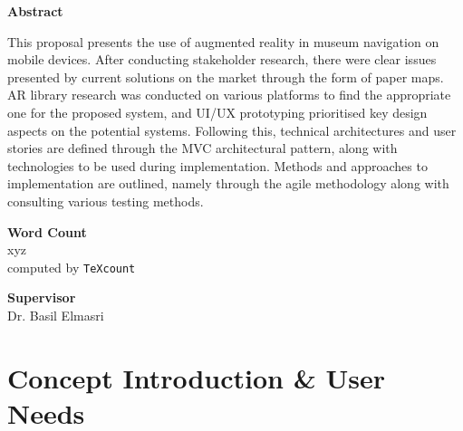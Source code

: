 \documentclass[12pt]{report}
\newcommand\blankpage{%
    \null
    \thispagestyle{empty}%
    \addtocounter{page}{-1}%
    \newpage}
\begin{document}
\begin{center}        
    \large
    \textbf{Abstract}\\
\end{center}

This proposal presents the use of augmented reality in museum navigation on mobile devices. After conducting stakeholder research, there were clear issues presented by current solutions on the market through the form of paper maps. AR library research was conducted on various platforms to find the appropriate one for the proposed system, and UI/UX prototyping prioritised key design aspects on the potential systems. Following this, technical architectures and user stories are defined through the MVC architectural pattern, along with technologies to be used during implementation. Methods and approaches to implementation are outlined, namely through the agile methodology along with consulting various testing methods.

\vspace*{1.5cm}
\begin{center}    
    \large
    \textbf{Word Count}\\
    xyz\\
    \normalsize computed by \texttt{TeXcount}
\end{center}

\vspace*{1.5cm}
\begin{center}    
    \large
    \textbf{Supervisor}\\
    \normalsize Dr. Basil Elmasri
\end{center}

\afterpage{\blankpage}


\setcounter{tocdepth}{0}
\tableofcontents

\setcounter{tocdepth}{1}
\listoffigures


\printnomenclature[1in]

\afterpage{\blankpage}


\chapter{Concept Introduction \& User Needs}

\end{document}

